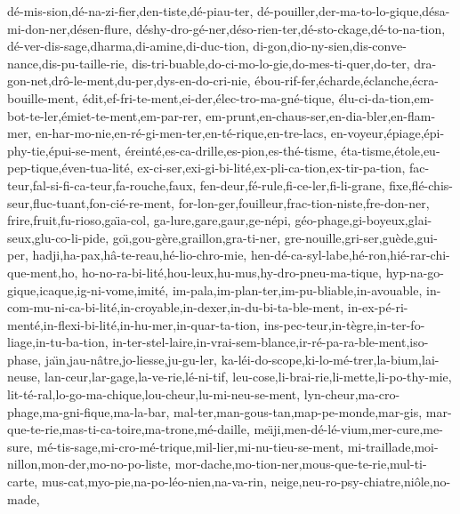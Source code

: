 d\'{e}-mis-sion,d\'{e}-na-zi-fier,den-tiste,d\'{e}-piau-ter,%
d\'{e}-pouiller,der-ma-to-lo-gique,d\'{e}sa-mi-don-ner,d\'{e}sen-flure,%
d\'{e}shy-dro-g\'{e}-ner,d\'{e}so-rien-ter,d\'{e}-sto-ckage,d\'{e}-to-na-tion,%
d\'{e}-ver-dis-sage,dharma,di-amine,di-duc-tion,%
di-gon,dio-ny-sien,dis-conve-nance,dis-pu-taille-rie,%
dis-tri-buable,do-ci-mo-lo-gie,do-mes-ti-quer,do-ter,%
dra-gon-net,dr\^{o}-le-ment,du-per,dys-en-do-cri-nie,%
\'{e}bou-rif-fer,\'{e}charde,\'{e}clanche,\'{e}cra-bouille-ment,%
\'{e}dit,ef-fri-te-ment,ei-der,\'{e}lec-tro-ma-gn\'{e}-tique,%
\'{e}lu-ci-da-tion,em-bot-te-ler,\'{e}miet-te-ment,em-par-rer,%
em-prunt,en-chaus-ser,en-dia-bler,en-flam-mer,%
en-har-mo-nie,en-r\'{e}-gi-men-ter,en-t\'{e}-rique,en-tre-lacs,%
en-voyeur,\'{e}piage,\'{e}pi-phy-tie,\'{e}pui-se-ment,%
\'{e}reint\'{e},es-ca-drille,es-pion,es-th\'{e}-tisme,%
\'{e}ta-tisme,\'{e}tole,eu-pep-tique,\'{e}ven-tua-lit\'{e},%
ex-ci-ser,exi-gi-bi-lit\'{e},ex-pli-ca-tion,ex-tir-pa-tion,%
fac-teur,fal-si-fi-ca-teur,fa-rouche,faux,%
fen-deur,f\'{e}-rule,fi-ce-ler,fi-li-grane,%
fixe,fl\'{e}-chis-seur,fluc-tuant,fon-ci\'{e}-re-ment,%
for-lon-ger,fouilleur,frac-tion-niste,fre-don-ner,%
frire,fruit,fu-rioso,ga\"{\i}a-col,%
ga-lure,gare,gaur,ge-n\'{e}pi,%
g\'{e}o-phage,gi-boyeux,glai-seux,glu-co-li-pide,%
go\"{\i},gou-g\`{e}re,graillon,gra-ti-ner,%
gre-nouille,gri-ser,gu\`{e}de,gui-per,%
hadji,ha-pax,h\^{a}-te-reau,h\'{e}-lio-chro-mie,%
hen-d\'{e}-ca-syl-labe,h\'{e}-ron,hi\'{e}-rar-chi-que-ment,ho,%
ho-no-ra-bi-lit\'{e},hou-leux,hu-mus,hy-dro-pneu-ma-tique,%
hyp-na-go-gique,icaque,ig-ni-vome,imit\'{e},%
im-pala,im-plan-ter,im-pu-bliable,in-avouable,%
in-com-mu-ni-ca-bi-lit\'{e},in-croyable,in-dexer,in-du-bi-ta-ble-ment,%
in-ex-p\'{e}-ri-ment\'{e},in-flexi-bi-lit\'{e},in-hu-mer,in-quar-ta-tion,%
ins-pec-teur,in-t\`{e}gre,in-ter-fo-liage,in-tu-ba-tion,%
in-ter-stel-laire,in-vrai-sem-blance,ir-r\'{e}-pa-ra-ble-ment,iso-phase,%
ja\"{\i}n,jau-n\^{a}tre,jo-liesse,ju-gu-ler,%
ka-l\'{e}i-do-scope,ki-lo-m\'{e}-trer,la-bium,lai-neuse,%
lan-ceur,lar-gage,la-ve-rie,l\'{e}-ni-tif,%
leu-cose,li-brai-rie,li-mette,li-po-thy-mie,%
lit-t\'{e}-ral,lo-go-ma-chique,lou-cheur,lu-mi-neu-se-ment,%
lyn-cheur,ma-cro-phage,ma-gni-fique,ma-la-bar,%
mal-ter,man-gous-tan,map-pe-monde,mar-gis,%
mar-que-te-rie,mas-ti-ca-toire,ma-trone,m\'{e}-daille,%
me\"{\i}ji,men-d\'{e}-l\'{e}-vium,mer-cure,me-sure,%
m\'{e}-tis-sage,mi-cro-m\'{e}-trique,mil-lier,mi-nu-tieu-se-ment,%
mi-traillade,moi-nillon,mon-der,mo-no-po-liste,%
mor-dache,mo-tion-ner,mous-que-te-rie,mul-ti-carte,%
mus-cat,myo-pie,na-po-l\'{e}o-nien,na-va-rin,%
neige,neu-ro-psy-chiatre,ni\^{o}le,no-made,%
